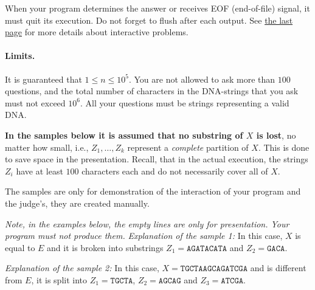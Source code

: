 When your program determines the answer or receives EOF (end-of-file) signal, it must quit its execution.
Do not forget to flush after each output.
See \hyperlink{info-interactive}{the last page} for more details about interactive problems.

\paragraph{Limits.}
It is guaranteed that $1 \leq n \leq 10^5$.
You are not allowed to ask more than $100$ questions, and the total number of characters in the DNA-strings that you ask must not exceed $10^6$.
All your questions must be strings representing a valid DNA.

\textbf{In the samples below it is assumed that no substring of $X$ is lost}, no matter how small, i.e., $Z_1, \dots, Z_k$ represent a \emph{complete} partition of $X$.
This is done to save space in the presentation.
Recall, that in the actual execution, the strings $Z_i$ have at least $100$ characters each and do not necessarily cover all of $X$.

The samples are only for demonstration of the interaction of your program and the judge's, they are created manually.

\emph{Note, in the examples below, the empty lines are only for presentation.
Your program must not produce them.}
{
\renewcommand{\sampleinputname}{Laboratory's feedback}
\renewcommand{\sampleoutputname}{Your questions}
}
\emph{Explanation of the sample 1:}
In this case, $X$ is equal to $E$ and it is broken into substrings $Z_1 = \texttt{AGATACATA}$ and $Z_2 = \texttt{GACA}$.

{
\renewcommand{\sampleinputname}{Laboratory's feedback}
\renewcommand{\sampleoutputname}{Your questions}
}
\emph{Explanation of the sample 2:}
In this case, $X = \texttt{TGCTAAGCAGATCGA}$ and is different from $E$, it is split into $Z_1 = \texttt{TGCTA}$, $Z_2 = \texttt{AGCAG}$ and $Z_3 = \texttt{ATCGA}$.